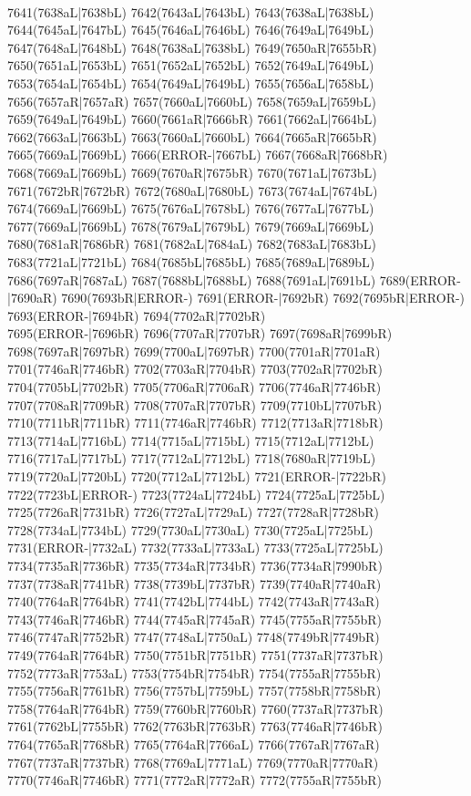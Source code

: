 \\7641(7638aL|7638bL) 7642(7643aL|7643bL) 7643(7638aL|7638bL) 7644(7645aL|7647bL) 7645(7646aL|7646bL) 7646(7649aL|7649bL) 7647(7648aL|7648bL) 7648(7638aL|7638bL) 7649(7650aR|7655bR) \\7650(7651aL|7653bL) 7651(7652aL|7652bL) 7652(7649aL|7649bL) 7653(7654aL|7654bL) 7654(7649aL|7649bL) 7655(7656aL|7658bL) 7656(7657aR|7657aR) 7657(7660aL|7660bL) 7658(7659aL|7659bL) \\7659(7649aL|7649bL) 7660(7661aR|7666bR) 7661(7662aL|7664bL) 7662(7663aL|7663bL) 7663(7660aL|7660bL) 7664(7665aR|7665bR) 7665(7669aL|7669bL) 7666(ERROR-|7667bL) 7667(7668aR|7668bR) \\7668(7669aL|7669bL) 7669(7670aR|7675bR) 7670(7671aL|7673bL) 7671(7672bR|7672bR) 7672(7680aL|7680bL) 7673(7674aL|7674bL) 7674(7669aL|7669bL) 7675(7676aL|7678bL) 7676(7677aL|7677bL) \\7677(7669aL|7669bL) 7678(7679aL|7679bL) 7679(7669aL|7669bL) 7680(7681aR|7686bR) 7681(7682aL|7684aL) 7682(7683aL|7683bL) 7683(7721aL|7721bL) 7684(7685bL|7685bL) 7685(7689aL|7689bL) \\7686(7697aR|7687aL) 7687(7688bL|7688bL) 7688(7691aL|7691bL) 7689(ERROR-|7690aR) 7690(7693bR|ERROR-) 7691(ERROR-|7692bR) 7692(7695bR|ERROR-) 7693(ERROR-|7694bR) 7694(7702aR|7702bR) \\7695(ERROR-|7696bR) 7696(7707aR|7707bR) 7697(7698aR|7699bR) 7698(7697aR|7697bR) 7699(7700aL|7697bR) 7700(7701aR|7701aR) 7701(7746aR|7746bR) 7702(7703aR|7704bR) 7703(7702aR|7702bR) \\7704(7705bL|7702bR) 7705(7706aR|7706aR) 7706(7746aR|7746bR) 7707(7708aR|7709bR) 7708(7707aR|7707bR) 7709(7710bL|7707bR) 7710(7711bR|7711bR) 7711(7746aR|7746bR) 7712(7713aR|7718bR) \\7713(7714aL|7716bL) 7714(7715aL|7715bL) 7715(7712aL|7712bL) 7716(7717aL|7717bL) 7717(7712aL|7712bL) 7718(7680aR|7719bL) 7719(7720aL|7720bL) 7720(7712aL|7712bL) 7721(ERROR-|7722bR) \\7722(7723bL|ERROR-) 7723(7724aL|7724bL) 7724(7725aL|7725bL) 7725(7726aR|7731bR) 7726(7727aL|7729aL) 7727(7728aR|7728bR) 7728(7734aL|7734bL) 7729(7730aL|7730aL) 7730(7725aL|7725bL) \\7731(ERROR-|7732aL) 7732(7733aL|7733aL) 7733(7725aL|7725bL) 7734(7735aR|7736bR) 7735(7734aR|7734bR) 7736(7734aR|7990bR) 7737(7738aR|7741bR) 7738(7739bL|7737bR) 7739(7740aR|7740aR) \\7740(7764aR|7764bR) 7741(7742bL|7744bL) 7742(7743aR|7743aR) 7743(7746aR|7746bR) 7744(7745aR|7745aR) 7745(7755aR|7755bR) 7746(7747aR|7752bR) 7747(7748aL|7750aL) 7748(7749bR|7749bR) \\7749(7764aR|7764bR) 7750(7751bR|7751bR) 7751(7737aR|7737bR) 7752(7773aR|7753aL) 7753(7754bR|7754bR) 7754(7755aR|7755bR) 7755(7756aR|7761bR) 7756(7757bL|7759bL) 7757(7758bR|7758bR) \\7758(7764aR|7764bR) 7759(7760bR|7760bR) 7760(7737aR|7737bR) 7761(7762bL|7755bR) 7762(7763bR|7763bR) 7763(7746aR|7746bR) 7764(7765aR|7768bR) 7765(7764aR|7766aL) 7766(7767aR|7767aR) \\7767(7737aR|7737bR) 7768(7769aL|7771aL) 7769(7770aR|7770aR) 7770(7746aR|7746bR) 7771(7772aR|7772aR) 7772(7755aR|7755bR) 